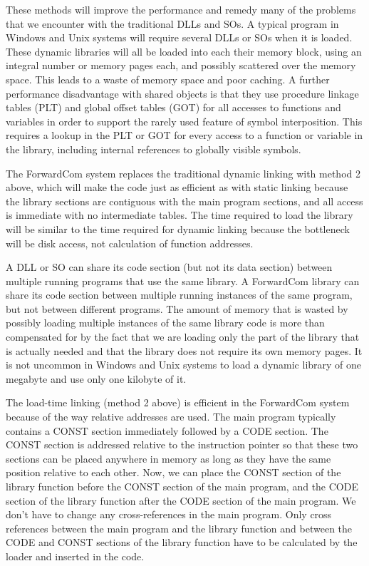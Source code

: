 \documentclass[forwardcom.tex]{subfiles}
\begin{document}
These methods will improve the performance and remedy many of the problems that we encounter with the traditional DLLs and SOs. A typical program in Windows and Unix systems will require several DLLs or SOs when it is loaded. These dynamic libraries will all be loaded into each their memory block, using an integral number or memory pages each, and possibly scattered over the memory space. This leads to a waste of memory space and poor caching. A further performance disadvantage with shared objects is that they use procedure linkage tables (PLT) and global offset tables (GOT) for all accesses to functions and variables in order to support the rarely used feature of symbol interposition. This requires a lookup in the PLT or GOT for every access to a function or variable in the library, including internal references to globally visible symbols.
\vspace{2mm}

The ForwardCom system replaces the traditional dynamic linking with method 2 above, which will make the code just as efficient as with static linking because the library sections are contiguous with the main program sections, and all access is immediate with no intermediate tables. The time required to load the library will be similar to the time required for dynamic linking because the bottleneck will be disk access, not calculation of function addresses. 
\vspace{2mm}

A DLL or SO can share its code section (but not its data section) between multiple running programs that use the same library. A ForwardCom library can share its code section between multiple running instances of the same program, but not between different programs. The amount of memory that is wasted by possibly loading multiple instances of the same library code is more than compensated for by the fact that we are loading only the part of the library that is actually needed and that the library does not require its own memory pages. It is not uncommon in Windows and Unix systems to load a dynamic library of one megabyte and use only one kilobyte of it. 
\vspace{2mm}

The load-time linking (method 2 above) is efficient in the ForwardCom system because of the way relative addresses are used. The main program typically contains a CONST section immediately followed by a CODE section. The CONST section is addressed relative to the instruction pointer so that these two sections can be placed anywhere in memory as long as they have the same position relative to each other. Now, we can place the CONST section of the library function before the CONST section of the main program, and the CODE section of the library function after the CODE section of the main program. We don't have to change any cross-references in the main program. Only cross references between the main program and the library function and between the CODE and CONST sections of the library function have to be calculated by the loader and inserted in the code.
\vspace{2mm}
\end{document}
